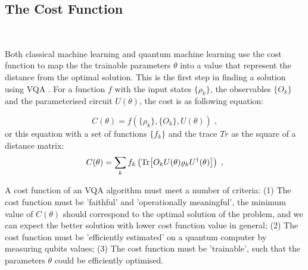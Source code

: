\subsection{The Cost Function} \label{Sec: The Cost Function}\


Both classical machine learning and quantum machine learning use the cost function to map the the trainable parameters $\theta$ into a value that represent the distance from the optimal solution.
This is the first step in finding a solution using VQA \cite{cerezo2021variational}.
For a function $f$ with the input states $\{\rho_k\}$, the observables $\{O_k\}$ and the parameterised circuit $U(\theta)$, the cost is as following equation:

\begin{equation}
    C(\theta) = f(\{\rho_k\}, \{O_k\}, U(\theta)) \;,
\end{equation}
or this equation with a set of functions $\{f_k\}$ and the trace $Tr$ as the square of a distance matrix:
\begin{equation}
    C(\theta) = \sum_k f_k \left(\Tr[ O_k U(\theta) \varrho_k U^\dagger(\theta) ]\right) \;,
    \label{Eqn: Cost function}
\end{equation}

A cost function of an VQA algorithm must meet a number of criteria:
(1) The cost function must be 'faithful' and 'operationally meaningful', the minimum value of $C(\theta)$ should correspond to the optimal solution of the problem, and we can expect the better solution with lower cost function value in general;
(2) The cost function must be 'efficiently estimated' on a quantum computer by measuring qubits values;
(3) The cost function must be 'trainable', such that the parameters $\theta$ could be efficiently optimised.